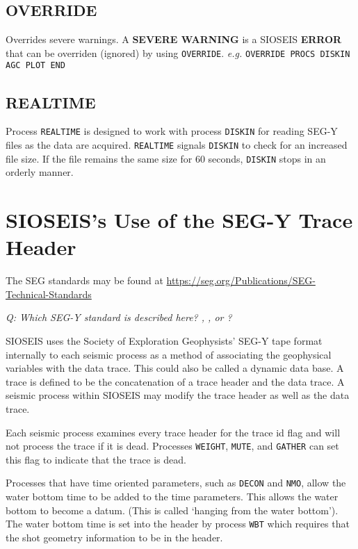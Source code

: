 \section{OVERRIDE}
\label{cmd_override}

Overrides severe warnings. A \textbf{SEVERE WARNING} is a SIOSEIS
\textbf{ERROR} that can be overriden (ignored) by using \texttt{OVERRIDE}.
\textit{e.g.} \texttt{OVERRIDE PROCS DISKIN AGC PLOT END}

\section{REALTIME}
\label{cmd_realtime}

Process \texttt{REALTIME} is designed to work with process \texttt{DISKIN} for
reading SEG-Y files as the data are acquired.  \texttt{REALTIME} signals
\texttt{DISKIN} to check for an increased file size.  If the file remains the
same size for 60 seconds, \texttt{DISKIN} stops in an orderly manner.

\chapter{SIOSEIS's Use of the SEG-Y Trace Header}
\label{c_segy_header}
The SEG standards may be found at
\url{https://seg.org/Publications/SEG-Technical-Standards}

\emph{Q: Which SEG-Y standard is described here? \cite{SEG_Y_r0},
\cite{SEG_Y_r1}, or \cite{SEG_Y_r2}?}

SIOSEIS uses the Society of Exploration Geophysists' SEG-Y tape format
internally to each seismic process as a method of associating the geophysical
variables with the data trace.  This could also be called a dynamic data base.
A trace is defined to be the concatenation of a trace header and the data
trace.  A seismic process within SIOSEIS may modify the trace header as well as
the data trace.

Each seismic process examines every trace header for the trace id flag and will
not process the trace if it is dead.  Processes \texttt{WEIGHT}, \texttt{MUTE},
and \texttt{GATHER} can set this flag to indicate that the trace is dead.

Processes that have time oriented parameters, such as \texttt{DECON} and
\texttt{NMO}, allow the water bottom time to be added to the time parameters.
This allows the water bottom to become a datum.  (This is called `hanging from
the water bottom').  The water bottom time is set into the header by process
\texttt{WBT} which requires that the \gls{shot} geometry information to be in the
header.

